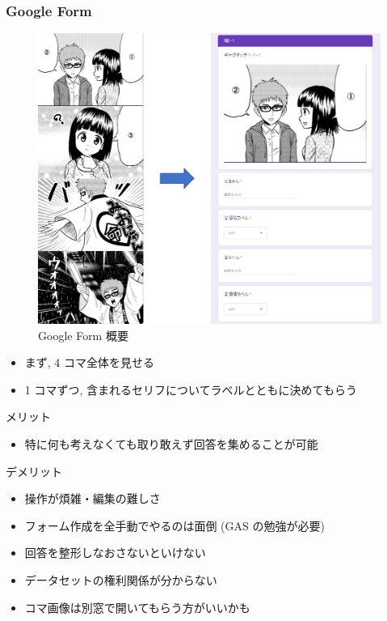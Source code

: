 \documentclass{jarticle}     %
\begin{document}
\subsubsection{Google Form}

\begin{figure}[!bth]
  \begin{center}
    \includegraphics[scale=0.7]{form.png}
    \caption{Google Form 概要} %
    \label{fig:form} %
  \end{center}
\end{figure}

\begin{itemize}
  \item まず, 4 コマ全体を見せる
  \item 1 コマずつ, 含まれるセリフについてラベルとともに決めてもらう
\end{itemize}

メリット

\begin{itemize}
  \item 特に何も考えなくても取り敢えず回答を集めることが可能
\end{itemize}

デメリット

\begin{itemize}
  \item 操作が煩雑・編集の難しさ
  \item フォーム作成を全手動でやるのは面倒 (GAS の勉強が必要)
  \item 回答を整形しなおさないといけない
  \item データセットの権利関係が分からない
  \item コマ画像は別窓で開いてもらう方がいいかも
\end{itemize}
\end{document}
